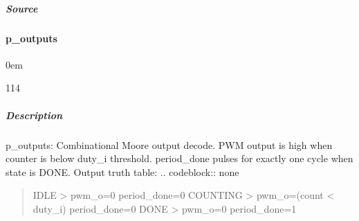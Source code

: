 \documentclass[letterpaper,10pt,english]{sphinxmanual}
\begin{document}
\noindent{}


\subparagraph{Source}
\label{\detokenize{modules/pwm_controller/processes/p_next_state:source}}
\begin{sphinxVerbatim}[commandchars=\\\{\}]
\end{sphinxVerbatim}

\sphinxstepscope


\paragraph{p\_outputs}
\label{\detokenize{modules/pwm_controller/processes/p_outputs:p-outputs}}\label{\detokenize{modules/pwm_controller/processes/p_outputs::doc}}
\begin{DUlineblock}{0em}
\item[]  
\item[]  114
\item[]  
\item[]  \sphinxcode{\sphinxupquote{*}}
\end{DUlineblock}


\subparagraph{Description}
\label{\detokenize{modules/pwm_controller/processes/p_outputs:description}}
\sphinxAtStartPar
p\_outputs: Combinational Moore output decode.
PWM output is high when counter is below duty\_i threshold.
period\_done pulses for exactly one cycle when state is DONE.
Output truth table:
.. code\sphinxhyphen{}block:: none
\begin{quote}

\sphinxAtStartPar
IDLE     \sphinxhyphen{}\textgreater{} pwm\_o=0 period\_done=0
COUNTING \sphinxhyphen{}\textgreater{} pwm\_o=(count \textless{} duty\_i) period\_done=0
DONE     \sphinxhyphen{}\textgreater{} pwm\_o=0 period\_done=1
\end{quote}
\end{document}
